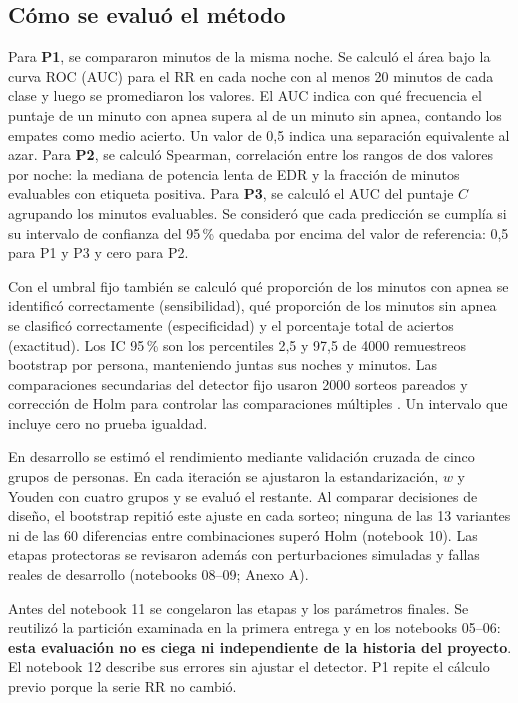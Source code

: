 \documentclass[10pt,a4paper]{article}
\begin{document}
\subsection{Cómo se evaluó el método}
Para \textbf{P1}, se compararon minutos de la misma noche. Se calculó el área bajo la curva ROC (AUC) para el RR en cada noche con al menos 20 minutos de cada clase y luego se promediaron los valores. El AUC indica con qué frecuencia el puntaje de un minuto con apnea supera al de un minuto sin apnea, contando los empates como medio acierto. Un valor de 0,5 indica una separación equivalente al azar. Para \textbf{P2}, se calculó Spearman, correlación entre los rangos de dos valores por noche: la mediana de potencia lenta de EDR y la fracción de minutos evaluables con etiqueta positiva. Para \textbf{P3}, se calculó el AUC del puntaje $C$ agrupando los minutos evaluables. Se consideró que cada predicción se cumplía si su intervalo de confianza del 95\,\% quedaba por encima del valor de referencia: 0,5 para P1 y P3 y cero para P2.

Con el umbral fijo también se calculó qué proporción de los minutos con apnea se identificó correctamente (sensibilidad), qué proporción de los minutos sin apnea se clasificó correctamente (especificidad) y el porcentaje total de aciertos (exactitud). Los IC 95\,\% son los percentiles 2,5 y 97,5 de 4000 remuestreos bootstrap por persona, manteniendo juntas sus noches y minutos. Las comparaciones secundarias del detector fijo usaron 2000 sorteos pareados y corrección de Holm para controlar las comparaciones múltiples \cite{holm}. Un intervalo que incluye cero no prueba igualdad.

En desarrollo se estimó el rendimiento mediante validación cruzada de cinco grupos de personas. En cada iteración se ajustaron la estandarización, $w$ y Youden con cuatro grupos y se evaluó el restante. Al comparar decisiones de diseño, el bootstrap repitió este ajuste en cada sorteo; ninguna de las 13 variantes ni de las 60 diferencias entre combinaciones superó Holm (notebook 10). Las etapas protectoras se revisaron además con perturbaciones simuladas y fallas reales de desarrollo (notebooks 08--09; Anexo A).

Antes del notebook 11 se congelaron las etapas y los parámetros finales. Se reutilizó la partición examinada en la primera entrega y en los notebooks 05--06: \textbf{esta evaluación no es ciega ni independiente de la historia del proyecto}. El notebook 12 describe sus errores sin ajustar el detector. P1 repite el cálculo previo porque la serie RR no cambió.
\end{document}
